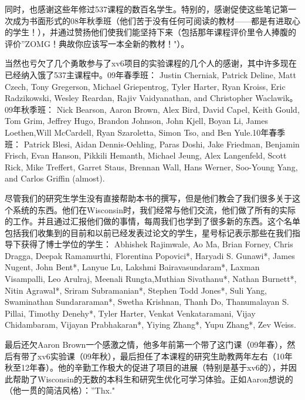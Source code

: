 同时，也感谢这些年修过537课程的数百名学生。特别的，感谢促使这些笔记第一次成为书面形式的08年秋季班（他们苦于没有任何可阅读的教材——都是有进取心的学生！），并通过赞扬他们使我们能坚持下来（包括那年课程评价里令人捧腹的评价”ZOMG！{典故}你应该写一本全新的教材！"）。

当然也亏欠了几个勇敢参与了xv6项目的实验课程的几个人的感谢，其中许多现在已经纳入饿了537主课程中。09年春季班： Justin Cherniak, Patrick Deline, Matt Czech, Tony Gregerson, Michael Griepentrog, Tyler Harter, Ryan Kroiss, Eric Radzikowski, Wesley Reardan, Rajiv Vaidyanathan, and Christopher Waclawik。09年秋季班： Nick Bearson, Aaron  Brown, Alex Bird, David Capel, Keith Gould, Tom Grim, Jeffrey Hugo, Brandon Johnson, John Kjell, Boyan Li, James Loethen,Will McCardell, Ryan Szaroletta, Simon Tso, and Ben Yule.10年春季班： Patrick Blesi, Aidan Dennis-Oehling, Paras Doshi, Jake Friedman, Benjamin Frisch, Evan Hanson, Pikkili Hemanth, Michael Jeung, Alex Langenfeld, Scott Rick, Mike Treffert, Garret Staus, Brennan Wall, Hans Werner, Soo-Young Yang, and Carlos Griffin (almost).

尽管我们的研究生学生没有直接帮助本书的撰写，但是他们教会了我们很多关于这个系统的东西。他们在Wisconsin时，我们经常与他们交流，他们做了所有的实际的工作。并且通过汇报他们做的事情，每周我们也学到了很多新的东西。这个名单包括我们收集到的目前和以前已经发表过论文的学生，星号标记表示那些在我们指导下获得了博士学位的学生： Abhishek Rajimwale, Ao Ma, Brian Forney, Chris Dragga, Deepak Ramamurthi, Florentina Popovici*, Haryadi S. Gunawi*, James Nugent, John Bent*, Lanyue Lu, Lakshmi Bairavasundaram*, Laxman Visampalli, Leo Arulraj, Meenali Rungta,Muthian Sivathanu*, Nathan Burnett*, Nitin Agrawal*, Sriram Subramanian*, Stephen Todd Jones*, Suli Yang, Swaminathan Sundararaman*, Swetha Krishnan, Thanh Do, Thanumalayan S. Pillai, Timothy Denehy*, Tyler Harter, Venkat Venkataramani, Vijay Chidambaram, Vijayan Prabhakaran*, Yiying Zhang*, Yupu Zhang*, Zev
Weiss.

最后还欠Aaron Brown一个感激之情，他多年前第一个带了这门课（09年春），然后有带了xv6实验课（09年秋），最后担任了本课程的研究生助教两年左右（10年秋至12年春）。他的辛勤工作极大的促进了项目的进展（特别是基于xv6的），并因此帮助了Wisconsin的无数的本科生和研究生优化可学习体验。正如Aaron想说的（他一贯的简洁风格）：”Thx."
